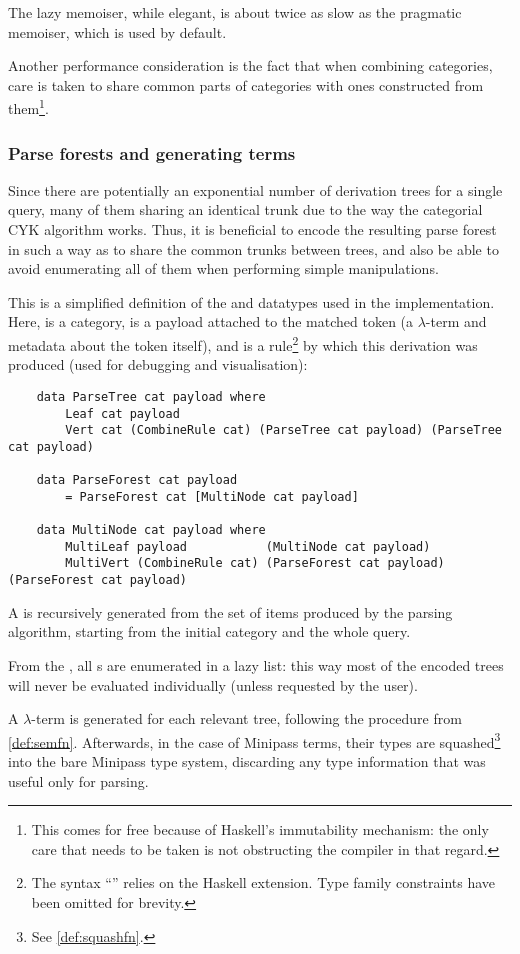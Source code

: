 \documentclass[main.tex]{subfiles}
\begin{document}
The lazy memoiser, while elegant, is about twice as slow as the pragmatic
memoiser, which is used by default.

Another performance consideration is the fact that when combining categories,
care is taken to share common parts of categories with ones constructed from
them\footnote{This comes for free because of Haskell's immutability mechanism:
    the only care that needs to be taken is not obstructing the compiler in
    that regard.
}.

\subsubsection{Parse forests and generating terms}\label{sec:termgen}
Since there are potentially an exponential number of derivation trees for a
single query, many of them sharing an identical trunk due to the way
the categorial CYK algorithm works. Thus, it is beneficial to encode the resulting
parse forest in such a way as to share the common trunks between trees, and
also be able to avoid enumerating all of them when performing simple manipulations.

This is a simplified definition of the  and 
datatypes used in the implementation. Here,  is a category,
 is a payload attached to the matched token (a $\lambda$-term and
metadata about the token itself), and  is a rule\footnote{
    The syntax ``'' relies on the 
    Haskell extension. Type family constraints have been omitted for brevity.
} by which this derivation was produced (used for debugging and visualisation):
\begin{lstlisting}
    data ParseTree cat payload where
        Leaf cat payload
        Vert cat (CombineRule cat) (ParseTree cat payload) (ParseTree cat payload)

    data ParseForest cat payload
        = ParseForest cat [MultiNode cat payload]

    data MultiNode cat payload where
        MultiLeaf payload           (MultiNode cat payload)
        MultiVert (CombineRule cat) (ParseForest cat payload) (ParseForest cat payload)
\end{lstlisting}

A  is recursively generated from the set of items produced
by the parsing algorithm, starting from the initial category and the whole query.

From the , all s are enumerated in a lazy
list: this way most of the encoded trees will never be evaluated individually
(unless requested by the user).

A $\lambda$-term is generated for each relevant tree, following the procedure
from \cref{def:semfn}. Afterwards, in the case of Minipass terms, their types are
squashed\footnote{See \cref{def:squashfn}.} into the bare Minipass type system,
discarding any type information that was useful only for parsing.
\end{document}
